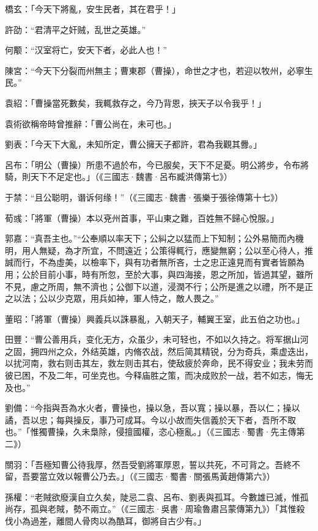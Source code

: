 橋玄：「今天下將亂，安生民者，其在君乎！」

許劭：“君清平之奸贼，乱世之英雄。”

何颙：“汉室将亡，安天下者，必此人也！”

陳宮：“今天下分裂而州無主；曹東郡（曹操），命世之才也，若迎以牧州，必寧生民。”

袁紹：「曹操當死數矣，我輒救存之，今乃背恩，挾天子以令我乎！」

袁術欲稱帝時曾推辭：「曹公尚在，未可也。」

劉表：「今天下大亂，未知所定，曹公擁天子都許，君為我觀其釁。」

呂布：「明公（曹操）所患不過於布，今已服矣，天下不足憂。明公將步，令布將騎，則天下不足定也。」（《三國志·魏書·呂布臧洪傳第七》）

于禁：“且公聪明，谮诉何缘！”（《三國志·魏書·張樂于張徐傳第十七》）

荀彧：「將軍（曹操）本以兗州首事，平山東之難，百姓無不歸心悅服。」

郭嘉：“真吾主也。”“公奉順以率天下；公糾之以猛而上下知制；公外易簡而內機明，用人無疑，為才所宜，不問遠近；公策得輒行，應變無窮；公以至心待人，推誠而行，不為虛美，以檢率下，與有功者無所吝，士之忠正遠見而有實者皆願為用；公於目前小事，時有所忽，至於大事，與四海接，恩之所加，皆過其望，雖所不見，慮之所周，無不濟也；公御下以道，浸潤不行；公所是進之以禮，所不是正之以法；公以少克眾，用兵如神，軍人恃之，敵人畏之。”

董昭：「將軍（曹操）興義兵以誅暴亂，入朝天子，輔翼王室，此五伯之功也。」

田豐：“曹公善用兵，变化无方，众虽少，未可轻也，不如以久持之。将军据山河之固，拥四州之众，外结英雄，内脩农战，然后简其精锐，分为奇兵，乘虚迭出，以扰河南，救右则击其左，救左则击其右，使敌疲於奔命，民不得安业；我未劳而彼已困，不及二年，可坐克也。今释庙胜之策，而决成败於一战，若不如志，悔无及也。”

劉備：“今指與吾為水火者，曹操也，操以急，吾以寬；操以暴，吾以仁；操以譎，吾以忠；每與操反，事乃可成耳。今以小故而失信義於天下者，吾所不取也。”「惟獨曹操，久未梟除，侵擅國權，恣心極亂。」（《三國志·蜀書·先主傳第二》）

關羽：「吾極知曹公待我厚，然吾受劉將軍厚恩，誓以共死，不可背之。吾終不留，吾要當立效以報曹公乃去。」（《三國志·蜀書·關張馬黃趙傳第六》）

孫權：“老賊欲廢漢自立久矣，陡忌二袁、呂布、劉表與孤耳。今數雄已滅，惟孤尚存，孤與老賊，勢不兩立。”（《三國志·吳書·周瑜魯肅吕蒙傳第九》）「其惟殺伐小為過差，離間人骨肉以為酷耳，御將自古少有。」

